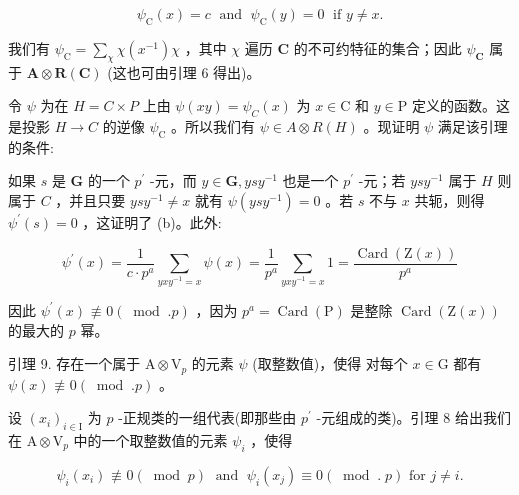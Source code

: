 \documentclass[10pt]{article}
\begin{document}
\[
{\psi }_{\mathrm{C}}\left( x\right)  = c\;\text{ and }\;{\psi }_{\mathrm{C}}\left( y\right)  = 0\;\text{ if }y \neq  x.
\]

我们有 \({\psi }_{\mathrm{C}} = \mathop{\sum }\limits_{\chi }\chi \left( {x}^{-1}\right) \chi\) ，其中 \(\chi\) 遍历 \(\mathbf{C}\) 的不可约特征的集合；因此 \({\psi }_{\mathbf{C}}\) 属于 \(\mathbf{A} \otimes  \mathbf{R}\left( \mathbf{C}\right)\) (这也可由引理 6 得出)。

令 \(\psi\) 为在 \(H = C \times  P\) 上由 \(\psi \left( {xy}\right)  = {\psi }_{C}\left( x\right)\) 为 \(x \in  \mathrm{C}\) 和 \(y \in  \mathrm{P}\) 定义的函数。这是投影 \(H \rightarrow  C\) 的逆像 \({\psi }_{\mathrm{C}}\) 。所以我们有 \(\psi  \in  A \otimes  R\left( H\right)\) 。现证明 \(\psi\) 满足该引理的条件:

如果 \(s\) 是 \(\mathbf{G}\) 的一个 \({p}^{\prime }\) -元，而 \(y \in  \mathbf{G},{ys}{y}^{-1}\) 也是一个 \({p}^{\prime }\) -元；若 \({ys}{y}^{-1}\) 属于 \(H\) 则属于 \(C\) ，并且只要 \({ys}{y}^{-1} \neq  x\) 就有 \(\psi \left( {{ys}{y}^{-1}}\right)  = 0\) 。若 \(s\) 不与 \(x\) 共轭，则得 \({\psi }^{\prime }\left( s\right)  = 0\) ，这证明了 (b)。此外:

\[
{\psi }^{\prime }\left( x\right)  = \frac{1}{c \cdot  {p}^{a}}\mathop{\sum }\limits_{{{yx}{y}^{-1} = x}}\psi \left( x\right)  = \frac{1}{{p}^{a}}\mathop{\sum }\limits_{{{yx}{y}^{-1} = x}}1 = \frac{\operatorname{Card}\left( {\mathrm{Z}\left( x\right) }\right) }{{p}^{a}}
\]

因此 \({\psi }^{\prime }\left( x\right)  \text{ ≢ } 0\left( {\;\operatorname{mod}\;.p}\right)\) ，因为 \({p}^{a} = \operatorname{Card}\left( \mathrm{P}\right)\) 是整除 \(\operatorname{Card}\left( {\mathrm{Z}\left( x\right) }\right)\) 的最大的 \(p\) 幂。

引理 9. 存在一个属于 \(\mathrm{A} \otimes  {\mathrm{V}}_{p}\) 的元素 \(\psi\) (取整数值)，使得 对每个 \(x \in  \mathrm{G}\) 都有 \(\psi \left( x\right)  \text{ ≢ } 0\left( {{\;\operatorname{mod}\;.}p}\right)\) 。

设 \({\left( {x}_{i}\right) }_{i \in  \mathrm{I}}\) 为 \(p\) -正规类的一组代表(即那些由 \({p}^{\prime }\) -元组成的类)。引理 8 给出我们在 \(\mathrm{A} \otimes  {\mathrm{V}}_{p}\) 中的一个取整数值的元素 \({\psi }_{i}\) ，使得

\[
{\psi }_{i}\left( {x}_{i}\right)  \text{ ≢ } 0\left( {\;\operatorname{mod}\;p}\right) \;\text{ and }\;{\psi }_{i}\left( {x}_{j}\right)  \equiv  0\left( {\;\operatorname{mod}\;.\;p}\right) \text{ for }j \neq  i.
\]
\end{document}
